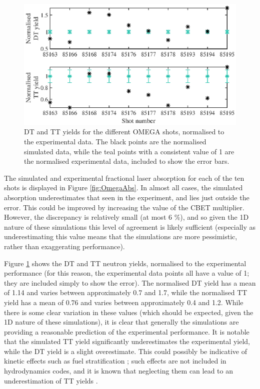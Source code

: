 \begin{figure}[ht]
\centering
\includegraphics{figures/LowCR/BenchmarkOmegaYield.eps}
\caption{DT and TT yields for the different OMEGA shots, normalised to the experimental data. The black points are the normalised simulated data, while the teal points with a consistent value of 1 are the normalised experimental data, included to show the error bars.}
\label{fig:OmegaYield}
\end{figure}

The simulated and experimental fractional laser absorption for each of the ten shots is displayed in Figure \ref{fig:OmegaAbs}. In almost all cases, the simulated absorption underestimates that seen in the experiment, and lies just outside the error. This could be improved by increasing the value of the CBET multiplier. However, the discrepancy is relatively small (at most 6 \%), and so given the 1D nature of these simulations this level of agreement is likely sufficient (especially as underestimating this value means that the simulations are more pessimistic, rather than exaggerating performance).

Figure \ref{fig:OmegaYield} shows the DT and TT neutron yields, normalised to the experimental performance (for this reason, the experimental data points all have a value of 1; they are included simply to show the error). The normalised DT yield has a mean of 1.14 and varies between approximately 0.7 and 1.7, while the normalised TT yield has a mean of 0.76 and varies between approximately 0.4 and 1.2. While there is some clear variation in these values (which should be expected, given the 1D nature of these simulations), it is clear that generally the simulations are providing a reasonable prediction of the experimental performance. It is notable that the simulated TT yield significantly underestimates the experimental yield, while the DT yield is a slight overestimate. This could possibly be indicative of kinetic effects such as fuel stratification \cite{Bellei2014}; such effects are not included in hydrodynamics codes, and it is known that neglecting them can lead to an underestimation of TT yields \cite{Casey2012}.


